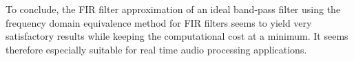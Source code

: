 \documentclass[journal]{IEEEtran}
\begin{document}
\newline
To conclude, the FIR filter approximation of an ideal band-pass filter using the frequency domain equivalence method for FIR filters seems to yield very satisfactory results while keeping the computational cost at a minimum. It seems therefore especially suitable for real time audio processing applications.
\end{document}
